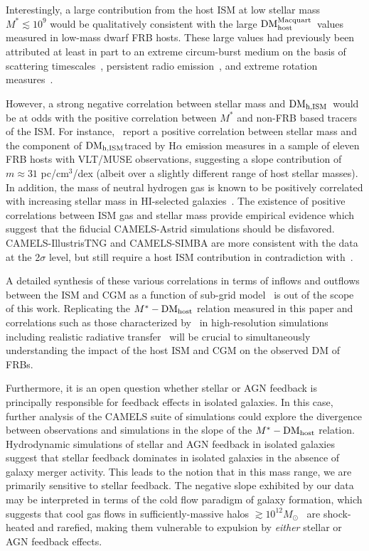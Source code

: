 \documentclass[twocolumn,linenumbers]{aastex631}
\newcommand{\dmh}{\ensuremath{{\rm DM}_\textrm{host}}}
\newcommand{\dmhm}{\ensuremath{{\rm DM}_\textrm{host}^\textrm{Macquart}}}
\newcommand{\dmhism}{\ensuremath{{\rm DM}_\textrm{h,ISM}}}
\begin{document}
Interestingly, a large contribution from the host ISM at low stellar mass $M^* \lesssim 10^{9}$ would be qualitatively consistent with the large \dmhm\ values measured in low-mass dwarf FRB hosts. These large values had previously been attributed at least in part to an extreme circum-burst medium on the basis of scattering timescales~\citep{caleb2023subarc}, persistent radio emission~\citep{marcote2020repeating,niu2021repeating,bhandari2023constraints}, and extreme rotation measures~\citep{michilli2018extreme}.

However, a strong negative correlation between stellar mass and \dmhism\ would be at odds with the positive correlation between $M^*$ and non-FRB based tracers of the ISM. For instance,~\citet{bernalescortes2025empirical} report a positive correlation between stellar mass and the component of \dmhism traced by H$\alpha$ emission measures in a sample of eleven FRB hosts with VLT/MUSE observations, suggesting a slope contribution of $m \approx 31$ pc/cm$^{3}$/dex (albeit over a slightly different range of host stellar masses). In addition, the mass of neutral hydrogen gas is known to be positively correlated with increasing stellar mass in HI-selected galaxies~\citep{huang2012arecibo,maddox2015variation,parkash2018relationships}.
The existence of positive correlations between ISM gas and stellar mass provide empirical evidence which suggest that the fiducial CAMELS-Astrid simulations should be disfavored. CAMELS-IllustrisTNG and CAMELS-SIMBA are more consistent with the data at the 2$\sigma$ level, but still require a host ISM contribution in contradiction with~\citet{bernalescortes2025empirical}. 

A detailed synthesis of these various correlations in terms of inflows and outflows between the ISM and CGM as a function of sub-grid model~\citep{wright2024baryon} is out of the scope of this work. 
Replicating the $M^*-\dmh$ relation measured in this paper and correlations such as those characterized by~\citet{bernalescortes2025empirical} in high-resolution simulations including realistic radiative transfer~\citep[such as extensions of][]{orr2024objects} will be crucial to simultaneously understanding the impact of the host ISM and CGM on the observed DM of FRBs. 

Furthermore, it is an open question whether stellar or AGN feedback is principally responsible for feedback effects in isolated galaxies. In this case, further analysis of the CAMELS suite of simulations could explore the divergence between observations and simulations in the slope of the $M^*-\dmh$ relation. Hydrodynamic simulations of stellar and AGN feedback in isolated galaxies~\citep{newton2013study} suggest that stellar feedback dominates in isolated galaxies in the absence of galaxy merger activity. This leads to the notion that in this mass range, we are primarily sensitive to stellar feedback. 
The negative slope exhibited by our data may be interpreted in terms of the cold flow paradigm of galaxy formation, which suggests that cool gas flows in sufficiently-massive halos $\gtrsim 10^{12} M_\odot$~\citep[see e.g.,][]{dekel2006galaxy} are shock-heated and rarefied, making them vulnerable to expulsion by \emph{either} stellar or AGN feedback effects. 
\end{document}
